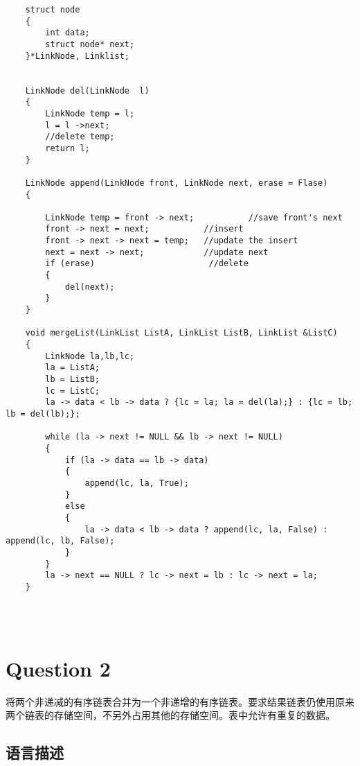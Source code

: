 \documentclass{article}
\begin{document}
\begin{verbatim}
    struct node
    {
        int data;
        struct node* next;
    }*LinkNode, Linklist;


    LinkNode del(LinkNode  l)
    {
        LinkNode temp = l;
        l = l ->next;
        //delete temp;
        return l;
    }

    LinkNode append(LinkNode front, LinkNode next, erase = Flase)
    {	
    
        LinkNode temp = front -> next;           //save front's next
        front -> next = next;           //insert
        front -> next -> next = temp;   //update the insert
        next = next -> next;            //update next
        if (erase)                       //delete
        {
            del(next);
        }
    }

    void mergeList(LinkList ListA, LinkList ListB, LinkList &ListC)
    {
        LinkNode la,lb,lc;
        la = ListA;
        lb = ListB;
        lc = ListC;
        la -> data < lb -> data ? {lc = la; la = del(la);} : {lc = lb; lb = del(lb);};

        while (la -> next != NULL && lb -> next != NULL)
        {
            if (la -> data == lb -> data)
            {
                append(lc, la, True);
            }
            else
            {
                la -> data < lb -> data ? append(lc, la, False) : append(lc, lb, False);
            }
        }
        la -> next == NULL ? lc -> next = lb : lc -> next = la;
    }




\end{verbatim}










\section{Question 2} 

将两个非递减的有序链表合并为一个非递增的有序链表。要求结果链表仍使用原来两个链表的存储空间，不另外占用其他的存储空间。表中允许有重复的数据。


\subsection{语言描述} 
\end{document}
